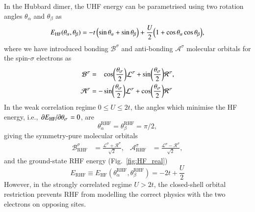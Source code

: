 \documentclass[aps,prb,reprint,noshowkeys,superscriptaddress]{revtex4-1}
\newcommand{\latin}[1]{#1}
\newcommand{\ie}{\latin{i.e.}}
\newcommand{\ta}{\theta_{\alpha}}
\newcommand{\tb}{\theta_{\beta}}
\newcommand{\Lsi}{\mathcal{L}^{\sigma}}
\newcommand{\Rsi}{\mathcal{R}^{\sigma}}
\begin{document}
In the Hubbard dimer, the UHF energy can be parametrised using two rotation angles $\ta$ and $\tb$ as
\begin{equation}
E_\text{HF}(\ta, \tb) = -t\, \qty( \sin \ta + \sin \tb ) + \frac{U}{2} \qty( 1 + \cos \ta \cos \tb ),
\end{equation}
where we have introduced bonding $\mathcal{B}^{\sigma}$ and anti-bonding $\mathcal{A}^{\sigma}$ molecular orbitals for 
the spin-$\sigma$ electrons as
\begin{subequations}
\begin{align}
    \mathcal{B}^{\sigma} & = \hphantom{-} \cos(\frac{\theta_\sigma}{2}) \Lsi + \sin(\frac{\theta_\sigma}{2}) \Rsi,
	\\
	\mathcal{A}^{\sigma} & = - \sin(\frac{\theta_\sigma}{2}) \Lsi + \cos(\frac{\theta_\sigma}{2}) \Rsi
\end{align}
\label{eq:RHF_orbs}
\end{subequations}
In the weak correlation regime $0 \le U \le 2t$, the angles which minimise the HF energy, 
\ie, $\pdv*{E_\text{HF}}{\theta_\sigma} = 0$, are 
\begin{equation}
	\ta^\text{RHF} = \tb^\text{RHF} = \pi/2,
\end{equation}
giving the symmetry-pure molecular orbitals
\begin{align}
	\mathcal{B}_\text{RHF}^{\sigma} & = \frac{\Lsi + \Rsi}{\sqrt{2}},
	&
	\mathcal{A}_\text{RHF}^{\sigma} & = \frac{\Lsi - \Rsi}{\sqrt{2}},
\end{align}
and the ground-state RHF energy (Fig.~\ref{fig:HF_real})
\begin{equation}
	E_\text{RHF} \equiv E_\text{HF}(\ta^\text{RHF}, \tb^\text{RHF}) = -2t + \frac{U}{2}
\end{equation}
However, in the strongly correlated regime $U>2t$, the closed-shell orbital restriction prevents RHF from 
modelling the correct physics with the two electrons on opposing sites.
\end{document}
